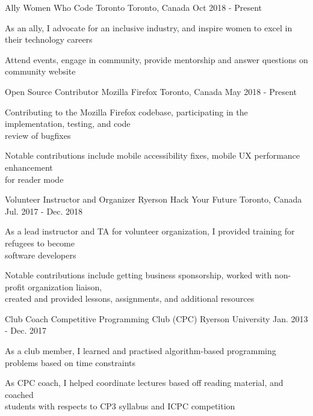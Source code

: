 \begin{cventries}
	\cventry
    {Ally}
    {Women Who Code Toronto}
    {Toronto, Canada}
    {Oct 2018 - Present}
    {
      \begin{cvitems}
        \item {As an ally, I advocate for an inclusive industry, and inspire women to excel in their technology careers}
        \item {Attend events, engage in community, provide mentorship and answer questions on community website}
      \end{cvitems}
    }
    \cventry
    {Open Source Contributor}
    {Mozilla Firefox}
    {Toronto, Canada}
    {May 2018 - Present}
    {
      \begin{cvitems}
        \item {Contributing to the Mozilla Firefox codebase, participating in the implementation, testing, and code \\review of bugfixes}
        \item {Notable contributions include mobile accessibility fixes, mobile UX performance enhancement \\for reader mode}
      \end{cvitems}
    }
     \cventry
    {Volunteer Instructor and Organizer}
    {Ryerson Hack Your Future}
    {Toronto, Canada}
    {Jul. 2017 - Dec. 2018}
    {
      \begin{cvitems}
        \item {As a lead instructor and TA for volunteer organization, I provided training for refugees to become \\ software developers}
        \item {Notable contributions include getting business sponsorship, worked with non-profit organization liaison, \\created and provided lessons, assignments, and additional resources}
      \end{cvitems}
    }
   \cventry
    {Club Coach}
    {Competitive Programming Club (CPC)}
    {Ryerson University}
    {Jan. 2013 - Dec. 2017}
    {
      \begin{cvitems}
        \item {As a club member, I learned and practised algorithm-based programming problems based on time constraints}
        \item {As CPC coach, I helped coordinate lectures based off reading material, and coached \\students with respects to CP3 syllabus and ICPC competition}

\end{cvitems}}
\end{cventries}
